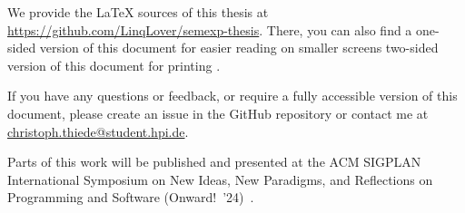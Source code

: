 
\noindent
\begingroup
	We provide the \LaTeX{} sources of this thesis at \url{https://github.com/LinqLover/semexp-thesis}.
	There, you can also find a
	\makeatletter
	\if@twoside
		one-sided version of this document for easier reading on smaller screens%
	\else
		two-sided version of this document for printing%
	\fi%
	\makeatother%
	.

	If you have any questions or feedback, or require a fully accessible version of this document, please create an issue in the GitHub repository or contact me at \href{mailto:christoph.thiede@student.hpi.de}{christoph.\allowbreak thiede@\allowbreak student.hpi.de}.

	\ParSep

	Parts of this work will be published and presented at the ACM SIGPLAN International Symposium on New Ideas, New Pa\-ra\-digms, and Reflections on Programming and Software (Onward!~'24)~\cite{thiede2024talking}.
\endgroup
